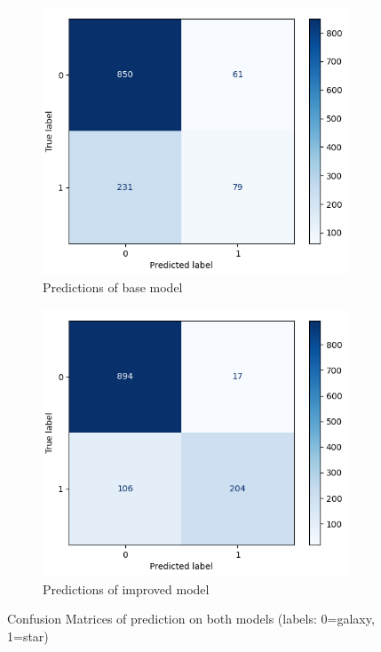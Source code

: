 \documentclass[
a4paper,     %
10pt         %
]{scrartcl}  %
\begin{document}
\begin{figure}[H]
    \centering
    \begin{subfigure}{.46\textwidth}
        \centering
        \includegraphics[width=\textwidth]{figures/basic_confusion}
        \caption{\label{fig:confusion_basic}Predictions of base model}
    \end{subfigure}
    \begin{subfigure}{.46\textwidth}
        \centering
        \includegraphics[width=\textwidth]{figures/improved_confusion}
        \caption{\label{fig:confusion_improved}Predictions of improved model}
    \end{subfigure}
    \caption{\label{fig:confusion_comp}Confusion Matrices of prediction on both models (labels: 0=galaxy, 1=star)}
\end{figure}
\end{document}
